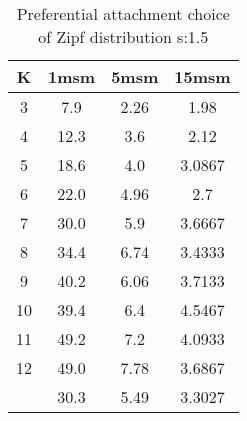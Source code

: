 \begin{table}[H]
\centering
\begin{tabular}{c|ccc}
K &1msm &5msm &15msm\\
\hline
3 & 7.9 & 2.26 & 1.98\\
4 & 12.3 & 3.6 & 2.12\\
5 & 18.6 & 4.0 & 3.0867\\
6 & 22.0 & 4.96 & 2.7\\
7 & 30.0 & 5.9 & 3.6667\\
8 & 34.4 & 6.74 & 3.4333\\
9 & 40.2 & 6.06 & 3.7133\\
10 & 39.4 & 6.4 & 4.5467\\
11 & 49.2 & 7.2 & 4.0933\\
12 & 49.0 & 7.78 & 3.6867\\
\hline
& 30.3 & 5.49 & 3.3027\\
\end{tabular}
\caption{Preferential attachment choice of Zipf distribution s:1.5}
\label{tab:s1.5}
\end{table}
